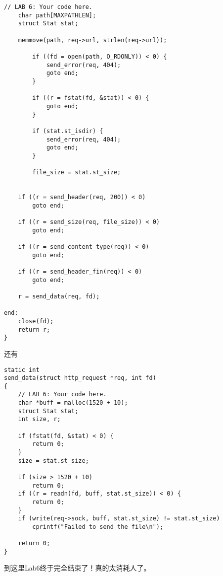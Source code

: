 \documentclass{article}
\begin{document}
\begin{CJK*}{UTF8}{gkai}
\begin{lstlisting}[style=ccode, title={\scriptsize \ttfamily \bfseries user/httpd.c: send\_file()}]
	// LAB 6: Your code here.
 	char path[MAXPATHLEN];
	struct Stat stat;

	memmove(path, req->url, strlen(req->url));

        if ((fd = open(path, O_RDONLY)) < 0) {
            send_error(req, 404);
            goto end;
        }

        if ((r = fstat(fd, &stat)) < 0) {
            goto end;
        }

        if (stat.st_isdir) {
            send_error(req, 404);
            goto end;
        }
 
        file_size = stat.st_size;


	if ((r = send_header(req, 200)) < 0)
		goto end;

	if ((r = send_size(req, file_size)) < 0)
		goto end;

	if ((r = send_content_type(req)) < 0)
		goto end;

	if ((r = send_header_fin(req)) < 0)
		goto end;

	r = send_data(req, fd);

end:
	close(fd);
	return r;
}
\end{lstlisting}

还有

\begin{lstlisting}[style=ccode, title={\scriptsize \ttfamily \bfseries user/httpd.c: send\_data()}]
static int
send_data(struct http_request *req, int fd)
{
	// LAB 6: Your code here.
	char *buff = malloc(1520 + 10);
	struct Stat stat;
	int size, r;

	if (fstat(fd, &stat) < 0) {
		return 0;
	}
	size = stat.st_size;

	if (size > 1520 + 10)
		return 0;
	if ((r = readn(fd, buff, stat.st_size)) < 0) {
		return 0;
	}
	if (write(req->sock, buff, stat.st_size) != stat.st_size)
		cprintf("Failed to send the file\n");

	return 0;
}
\end{lstlisting}

\vspace{3em}

到这里Lab6终于完全结束了！真的太消耗人了。

\clearpage

\end{CJK*}
\end{document}
